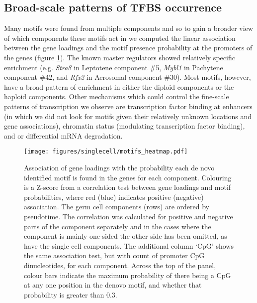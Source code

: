 \subsection{Broad-scale patterns of TFBS occurrence}
Many motifs were found from multiple components and so to gain a broader view of which components these motifs act in we computed the linear association between the gene loadings and the motif presence probability at the promoters of the genes (figure \ref{fig:motifs_heatmap}). The known master regulators showed relatively specific enrichment (e.g. \textit{Stra8} in Leptotene component \#5, \textit{Mybl1} in Pachytene component \#42, and \textit{Rfx2} in Acrosomal component \#30). Most motifs, however, have a broad pattern of enrichment in either the diploid components or the haploid components. Other mechanisms which could control the fine-scale patterns of transcription we observe are transcription factor binding at enhancers (in which we did not look for motifs given their relatively unknown locations and gene associations), chromatin status (modulating transcription factor binding), and or differential mRNA degradation.

\begin{figure}[H]
	\centering
	\texttt{[image: figures/singlecell/motifs\_heatmap.pdf]}
	\caption[Motifs Heatmap]{
		Association of gene loadings with the probability each de novo identified motif is found in the genes for each component. Colouring is a Z-score from a correlation test between gene loadings and motif probabilities, where red (blue) indicates positive (negative) association. The germ cell components (rows) are ordered by pseudotime. The correlation was calculated for positive and negative parts of the component separately and in the cases where the component is mainly one-sided the other side has been omitted, as have the single cell components. The additional column ‘CpG’ shows the same association test, but with count of promoter CpG dinucleotides, for each component. Across the top of the panel, colour bars indicate the maximum probability of there being a CpG at any one position in the denovo motif, and whether that probability is greater than 0.3.
	}
	\label{fig:motifs_heatmap}
\end{figure}


